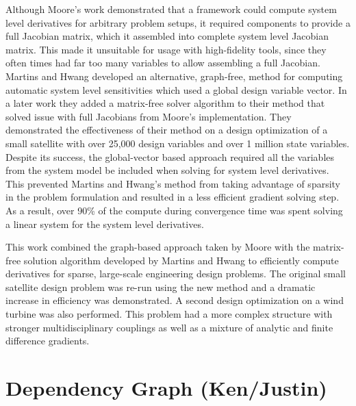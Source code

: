 \documentclass[]{aiaa-tc} %
\begin{document}
    Although Moore's work demonstrated that a framework could compute system level derivatives for arbitrary 
    problem setups, it required components to provide a full Jacobian matrix, which it assembled into 
    complete system level Jacobian matrix.  This made it unsuitable for usage with 
    high-fidelity tools, since they often times had far too many variables to allow assembling a full Jacobian. 
    Martins and Hwang developed an alternative, graph-free, method for computing automatic system 
    level sensitivities which used a global design variable vector\cite{Martins2012}. 
    In a later work they added a matrix-free solver algorithm to their method that solved issue with full Jacobians from 
    Moore's implementation. They demonstrated the effectiveness of their method on a design optimization of a small satellite
    with over 25,000 design variables and over 1 million state variables\cite{CADRE2012}. Despite its success,
    the global-vector based approach required all the variables from the system model be 
    included when solving for system level derivatives. This prevented Martins and Hwang's method 
    from taking advantage of sparsity in the problem formulation and resulted in a less efficient gradient solving step. 
    As a result, over 90\% of the compute during convergence time was spent solving a linear system for the system 
    level derivatives. 

    This work combined the graph-based approach taken by Moore with the matrix-free solution algorithm 
    developed by Martins and Hwang to efficiently compute derivatives for sparse, large-scale engineering 
    design problems. The original small satellite design problem was re-run using the new method and 
    a dramatic increase in efficiency was demonstrated. A second design optimization on a wind turbine was 
    also performed. This problem had a more complex structure with stronger multidisciplinary couplings as well as a
    mixture of analytic and finite difference gradients. 


  \section{Dependency Graph (Ken/Justin)}
\end{document}
